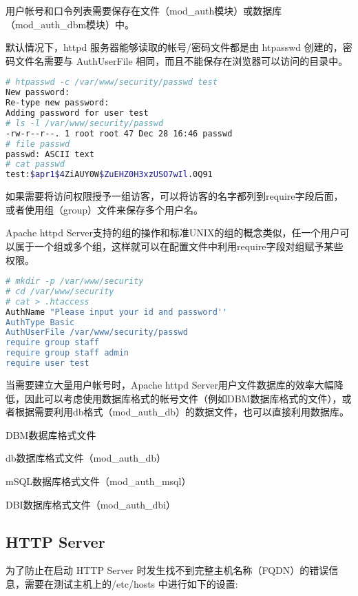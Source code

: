用户帐号和口令列表需要保存在文件（mod\_auth模块）或数据库（mod\_auth\_dbm模块）中。

默认情况下，httpd 服务器能够读取的帐号/密码文件都是由 htpasswd 创建的，密码文件名需要与 AuthUserFile 相同，而且不能保存在浏览器可以访问的目录中。



\begin{lstlisting}[language=bash]
# htpasswd -c /var/www/security/passwd test
New password:
Re-type new password:
Adding password for user test
# ls -l /var/www/security/passwd
-rw-r--r--. 1 root root 47 Dec 28 16:46 passwd
# file passwd 
passwd: ASCII text
# cat passwd
test:$apr1$4ZiAUY0W$ZuEHZ0H3xzUSO7wIl.0Q91
\end{lstlisting}

如果需要将访问权限授予一组访客，可以将访客的名字都列到require字段后面，或者使用组（group）文件来保存多个用户名。

Apache httpd Server支持的组的操作和标准UNIX的组的概念类似，任一个用户可以属于一个组或多个组，这样就可以在配置文件中利用require字段对组赋予某些权限。

\begin{lstlisting}[language=bash]
# mkdir -p /var/www/security
# cd /var/www/security
# cat > .htaccess
AuthName "Please input your id and password''
AuthType Basic
AuthUserFile /var/www/security/passwd
require group staff
require group staff admin
require user test
\end{lstlisting}

当需要建立大量用户帐号时，Apache httpd Server用户文件数据库的效率大幅降低，因此可以考虑使用数据库格式的帐号文件（例如DBM数据库格式的文件），或者根据需要利用db格式（mod\_auth\_db）的数据文件，也可以直接利用数据库。

\begin{compactitem}
\item DBM数据库格式文件
\item db数据库格式文件（mod\_auth\_db）
\item mSQL数据库格式文件（mod\_auth\_msql）
\item DBI数据库格式文件（mod\_auth\_dbi）
\end{compactitem}




\subsection{HTTP Server}

为了防止在启动 HTTP Server 时发生找不到完整主机名称（FQDN）的错误信息，需要在测试主机上的/etc/hosts 中进行如下的设置:




